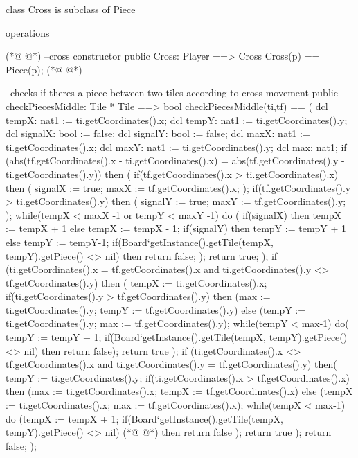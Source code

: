 \begin{vdmpp}[breaklines=true]
class Cross is subclass of Piece

operations

(*@
\label{Cross:5}
@*)
  --cross constructor
  public Cross: Player ==> Cross
  Cross(p) == Piece(p);
(*@
\label{checkPiecesMiddle:8}
@*)

  --checks if theres a piece between two tiles according to cross movement
  public checkPiecesMiddle: Tile * Tile ==> bool
  checkPiecesMiddle(ti,tf) == (
    dcl tempX: nat1 := ti.getCoordinates().x;
    dcl tempY: nat1 := ti.getCoordinates().y;
    dcl signalX: bool := false;
    dcl signalY: bool := false;
    dcl maxX: nat1 := ti.getCoordinates().x;
    dcl maxY: nat1 := ti.getCoordinates().y;
    dcl max: nat1;
    if (abs(tf.getCoordinates().x - ti.getCoordinates().x) = abs(tf.getCoordinates().y - ti.getCoordinates().y)) then (
     if(tf.getCoordinates().x > ti.getCoordinates().x)
      then (
       signalX := true;
       maxX := tf.getCoordinates().x;
      );
     if(tf.getCoordinates().y > ti.getCoordinates().y)
      then (
       signalY := true;
       maxY := tf.getCoordinates().y;
      );
     while(tempX < maxX -1 or tempY < maxY -1)
       do (
         if(signalX)
          then tempX := tempX + 1
         else tempX := tempX - 1;
         if(signalY)
          then tempY := tempY + 1
         else
          tempY := tempY-1;
         if(Board`getInstance().getTile(tempX, tempY).getPiece() <> nil)
          then return false;
         );
     return true;
    );
    if (ti.getCoordinates().x = tf.getCoordinates().x and ti.getCoordinates().y <> tf.getCoordinates().y)
     then (
        tempX := ti.getCoordinates().x;
        if(ti.getCoordinates().y > tf.getCoordinates().y)
         then (max := ti.getCoordinates().y; tempY := tf.getCoordinates().y)
         else (tempY := ti.getCoordinates().y; max := tf.getCoordinates().y);
        while(tempY < max-1)
         do(
           tempY := tempY + 1;
           if(Board`getInstance().getTile(tempX, tempY).getPiece() <> nil)
            then return false);
        return true
        );
    if (ti.getCoordinates().x <> tf.getCoordinates().x and ti.getCoordinates().y = tf.getCoordinates().y) 
     then(
         tempY := ti.getCoordinates().y;
         if(ti.getCoordinates().x > tf.getCoordinates().x)
         then (max := ti.getCoordinates().x; tempX := tf.getCoordinates().x)
         else (tempX := ti.getCoordinates().x; max := tf.getCoordinates().x);
        while(tempX < max-1)
         do (tempX := tempX + 1;
           if(Board`getInstance().getTile(tempX, tempY).getPiece() <> nil)
(*@
\label{canMoveTo:66}
@*)
            then return false
           );
        return true
    );
    return false;
  );


\end{vdmpp}
